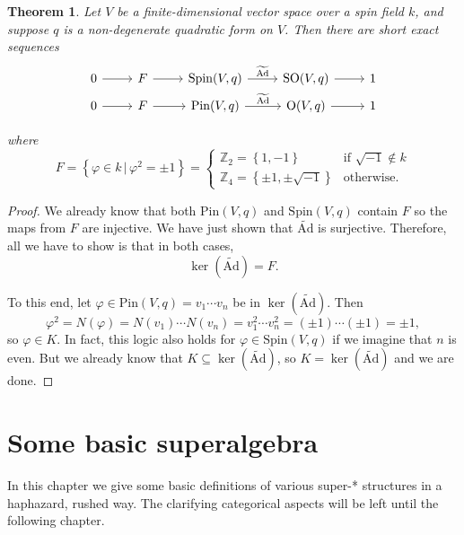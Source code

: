 \documentclass[a4paper,10pt]{scrreprt}
\newcommand{\Z}{\mathbb{Z}}
\newcommand{\tAd}{\widetilde{\mathrm{Ad}}}
\newcommand{\Pin}{\mathrm{Pin}}
\newcommand{\Spin}{\mathrm{Spin}}
\newcommand{\Or}{\mathrm{O}}
\newcommand{\SO}{\mathrm{SO}}
\theoremstyle{definition}
\theoremstyle{plain}
\newtheorem{theorem}{Theorem}[section]
\theoremstyle{remark}
\begin{document}
\begin{theorem}
  Let $V$ be a finite-dimensional vector space over a spin field $k$, and suppose $q$ is a non-degenerate quadratic form on $V$. Then there are short exact sequences
  \begin{equation*}
    \begin{tikzcd}[row sep=tiny]
      0 \arrow[r] & F \arrow[r] & \arrow[r, "\tAd"] \Spin(V, q) & \arrow[r] \SO(V, q) & 1 \\
      0 \arrow[r] & F \arrow[r] & \Pin(V, q) \arrow[r, "\tAd"] & \arrow[r] \Or(V, q) & 1 \\
    \end{tikzcd}
  \end{equation*}
  where
  \begin{equation*}
    F = \left\{ \varphi \in k\,\big|\, \varphi^{2} = \pm 1 \right\} =
    \begin{cases}
      \Z_{2} = \left\{ 1, -1 \right\} & \text{if } \sqrt{-1} \notin k \\
      \Z_{4} = \left\{\pm 1, \pm \sqrt{-1}\right\} & \text{otherwise.}
    \end{cases}
  \end{equation*}
\end{theorem}
\begin{proof}
  We already know that both $\Pin(V, q)$ and $\Spin(V, q)$ contain $F$ so the maps from $F$ are injective. We have just shown that $\tAd$ is surjective. Therefore, all we have to show is that in both cases,
  \begin{equation*}
    \ker(\tAd) = F.
  \end{equation*}

  To this end, let $\varphi \in \Pin(V, q) = v_{1}\cdots v_{n}$ be in $\ker(\tAd)$. Then
  \begin{equation*}
    \varphi^{2} = N(\varphi) = N(v_{1})\cdots N(v_{n}) = v_{1}^{2} \cdots v_{n}^{2} = (\pm 1)\cdots (\pm 1) = \pm 1,
  \end{equation*}
  so $\varphi \in K$. In fact, this logic also holds for $\varphi \in \Spin(V, q)$ if we imagine that $n$ is even. But we already know that $K \subseteq \ker(\tAd)$, so $K = \ker(\tAd)$ and we are done.
\end{proof}

\chapter{Some basic superalgebra} 
In this chapter we give some basic definitions of various super-* structures in a haphazard, rushed way. The clarifying categorical aspects will be left until the following chapter.
\end{document}
